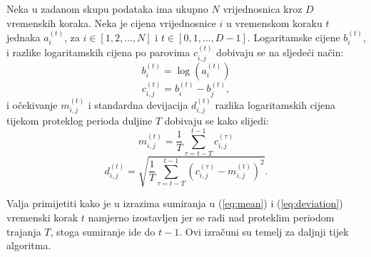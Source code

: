\documentclass[lmodern, utf8, diplomski, numeric]{fer}
\newcommand{\q}{\left}
\newcommand{\w}{\right}
\begin{document}
  Neka u zadanom skupu podataka ima ukupno $N$ vrijednosnica kroz $D$ vremenskih koraka.
  Neka je cijena vrijednosnice $i$ u vremenskom koraku $t$ jednaka $a_i^{\q(t\w)}$, za $i \in {\q[1, 2, \ldots, N\w]}$ i $t \in {\q[0, 1, \ldots, D-1\w]}$.
  Logaritamske cijene $b_i^{\q(t\w)}$, i razlike logaritamskih cijena po parovima $c_{i,j}^{\q(t\w)}$ dobivaju se na sljedeći način:
  \begin{equation} b_i^{\q(t\w)} = \log\q(a_i^{\q(t\w)}\w) \end{equation}
  \begin{equation} c_{i,j}^{\q(t\w)} = b_i^{\q(t\w)} - b_j^{\q(t\w)}, \end{equation}
  i očekivanje $m_{i,j}^{\q(t\w)}$ i standardna devijacija $d_{i,j}^{\q(t\w)}$ razlika logaritamskih cijena tijekom proteklog perioda duljine $T$ dobivaju se kako slijedi:
  \begin{equation}
  \label{eq:mean}
  m_{i,j}^{\q(t\w)} = \frac{1}{T}\sum_{\tau = t - T}^{t - 1} c_{i,j}^{(\tau)}
  \end{equation}
  \begin{equation}
  \label{eq:deviation}
  d_{i,j}^{\q(t\w)} = \sqrt{\frac{1}{T}\sum_{\tau=t - T}^{t - 1} \q(c_{i,j}^{(\tau)} - m_{i,j}^{\q(t\w)} \w)^2}.
  \end{equation}
  
  Valja primijetiti kako je u izrazima sumiranja u (\ref{eq:mean}) i (\ref{eq:deviation}) vremenski korak $t$ namjerno izostavljen jer se radi nad proteklim periodom trajanja $T$, stoga sumiranje ide do $t - 1$.
  Ovi izračuni su temelj za daljnji tijek algoritma.
\end{document}
